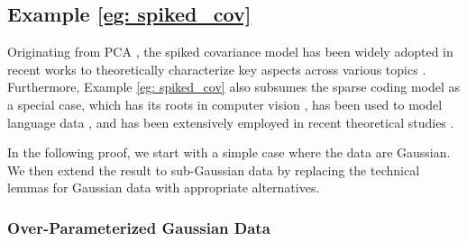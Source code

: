 \subsection{Example \ref{eg: spiked_cov}}\label{apdx: spiked_cov}

Originating from PCA \cite{johnstone2001distribution}, the spiked covariance model has been widely adopted in recent works to theoretically characterize key aspects across various topics \cite{ji2023power,nakada2023understanding,muthukumar2021classification,pezeshki2022multi,wu2024provable}. Furthermore, Example \ref{eg: spiked_cov} also subsumes the sparse coding model as a special case, which has its roots in computer vision \cite{olshausen1997sparse,foldiak2003sparse,olshausen2004sparse,yang2009linear,mairal2014sparse,papyan2017convolutional}, has been used to model language data \cite{arora2018linear}, and has been extensively employed in recent theoretical studies \cite{kalimeris2019sgd,allen2020towards,wen2021toward,zou2021understanding,shen2022data,xue2023features}. %

In the following proof, we start with a simple case where the data are Gaussian. We then extend the result to sub-Gaussian data by replacing the technical lemmas for Gaussian data with appropriate alternatives.


\subsubsection{Over-Parameterized Gaussian Data} \label{sec:gaussian_data}

